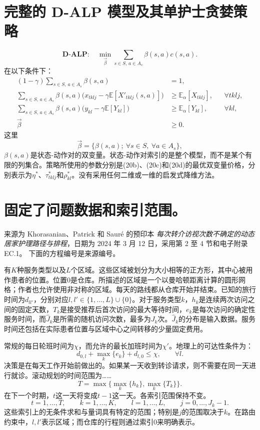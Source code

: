 \documentclass{article}
\begin{document}
\section*{完整的 D-ALP 模型及其单护士贪婪策略}
\begin{equation}
\mathbf{D\text{-}ALP}:\quad
\min_{\vec\beta}\sum_{s\in S,\,a\in A_s}\beta(s,a)c(s,a).
\tag{20a}
\end{equation}
在以下条件下：
\begin{align}
(1-\gamma)\sum_{s\in S,\,a\in A_s}\beta(s,a)&=1,\tag{20b}\\
\sum_{s\in S,\,a\in A_s}\beta(s,a)
\bigl(x_{tklj}-\gamma\mathbb E[X'_{tklj}(s,a)]\bigr)
&\geq\mathbb E_\alpha[X_{tklj}],&&\forall tklj,\tag{20c}\\
\sum_{s\in S,\,a\in A_s}\beta(s,a)
\bigl(y_{kl}-\gamma\mathbb E[Y_{kl}]\bigr)
&\geq\mathbb E_\alpha[Y_{kl}],&&\forall kl,\tag{20d}\\
\vec\beta&\geq0.\tag{20e}
\end{align}
这里
\[
\vec\beta=\{\beta(s,a);\ \forall s\in S,\ \forall a\in A_s\},
\]
$\beta(s,a)$是状态-动作对的双变量。状态-动作对索引的是整个模型，而不是某个有限的列集合。策略所使用的参数分别是(20b)、(20c)和(20d)的最优双变量价格，分别表示为$\eta^*$、$\tau^*_{tklj}$和$\rho^*_{kl}$。没有采用任何二维或一维的启发式降维方法。

\section*{固定了问题数据和索引范围。}
来源为 Khorasanian、Patrick 和 Saur\'e 的预印本 \emph{每次转介访视次数不确定的动态居家护理路径与排程}，日期为 2024 年 3 月 12 日，采用第 2 至 4 节和电子附录 EC.1。 下面的方程编号是来源编号。

有$K$种服务类型以及$L$个区域。这些区域被划分为大小相等的正方形，其中心被用作患者的位置。位置$0$是仓库。所描述的区域是一个以曼哈顿距离计算的圆形网格；作者也允许使用非对称的区域。每天的路线都从仓库开始并结束。已知的旅行时间为$d_{ll'}$，分别对应$l,l'\in\{1,\ldots,L\}\cup\{0\}$。对于服务类型$k$，$h_k$是连续两次访问之间的固定天数，$T_k$是接受推荐后首次访问的最大等待时间，$e_k$是每次访问的确定性服务时间，而$\hat J_k$是所需的随机访问次数，最多为$J_k$次。$\hat J_k$的分布是输入数据。服务时间还包括在实际患者位置与区域中心之间转移的少量固定费用。

常规的每日轮班时间为$\chi$，而允许的最长加班时间为$\chi'$。地理上的可达性条件为：
\[
d_{0,l}+\max_k\{e_k\}+d_{l,0}\leq\chi,\qquad\forall l.
\]
决策是在每天工作开始前做出的。如果某一天收到转诊请求，则不需要在同一天进行就诊。滚动规划的时间范围为……
\[
T=\max\{\max_k\{h_k\},\max_k\{T_k\}\}.
\]
在下一个时期，$t$这一天将变成$t-1$这一天。各索引范围保持不变。
\[
t=1,\ldots,T,\qquad k=1,\ldots,K,\qquad
l=1,\ldots,L,\qquad j=0,\ldots,J_k-1.
\]
这些索引上的无条件求和与量词具有特定的范围；特别是$j$的范围取决于$k$。在路由约束中，$l,l'$表示区域；而仓库的行程则通过索引$0$来明确表示。
\end{document}
